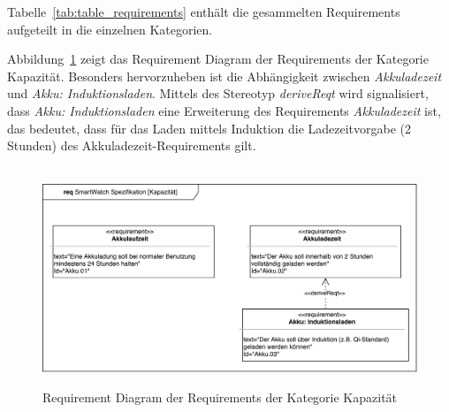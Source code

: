 Tabelle~\ref{tab:table_requirements} enthält die gesammelten Requirements aufgeteilt in die einzelnen Kategorien.

Abbildung~\ref{fig:requirement_diagram_akku} zeigt das Requirement Diagram der Requirements der Kategorie Kapazität. Besonders hervorzuheben ist die Abhängigkeit zwischen \textit{Akkuladezeit} und \textit{Akku: Induktionsladen}. Mittels des \gls{Stereotyp} \textit{deriveReqt} wird signalisiert, dass \textit{Akku: Induktionsladen} eine Erweiterung des Requirements \textit{Akkuladezeit} ist, das bedeutet, dass für das Laden mittels Induktion die Ladezeitvorgabe (2 Stunden) des Akkuladezeit-Requirements gilt.

\begin{figure}
\centering\
\includegraphics[width=14cm]{img/requirement_diagram_akku}
\caption[Requirements: Kapazität]{Requirement Diagram der Requirements der Kategorie Kapazität}
\label{fig:requirement_diagram_akku}
\end{figure}
